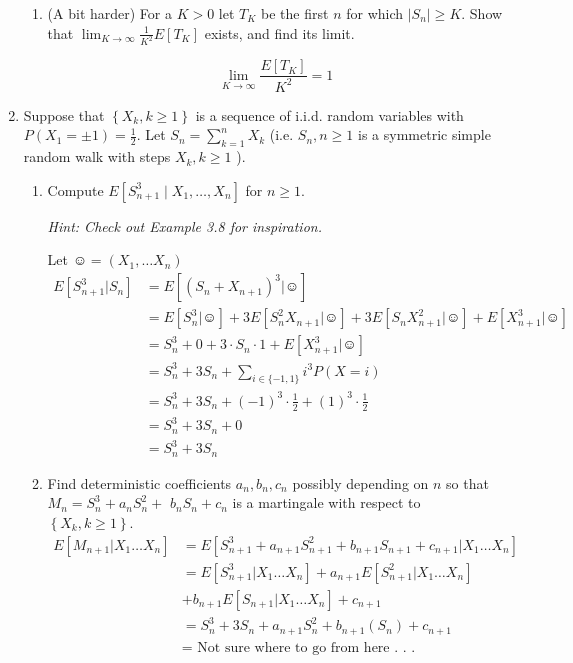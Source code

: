 \documentclass{article} %
\theoremstyle{plain}
\theoremstyle{case}
\begin{document}
\begin{enumerate}[label={\fbox{\textbf{Exercise \#\arabic* :}}}]
\begin{enumerate}
    \item  (A bit harder) For a $K>0$ let $T_K$ be the first $n$ for which $\left|S_n\right| \geq K$. Show that $\lim _{K \rightarrow \infty} \frac{1}{K^2} E\left[T_K\right]$ exists, and find its limit.

    \[ \lim_{K \to \infty} \frac{E[T_K]}{K^2} = 1 \]
  \end{enumerate}

\newpage
  \item Suppose that $\left\{X_k, k \geq 1\right\}$ is a sequence of i.i.d. random variables with $P\left(X_1= \pm 1\right)=\frac{1}{2}$. Let $S_n=\sum_{k=1}^n X_k$ (i.e. $S_n, n \geq 1$ is a symmetric simple random walk with steps $X_k, k \geq 1$ ).

\begin{enumerate}
  \item  Compute $E\left[S_{n+1}^3 \mid X_1, \ldots, X_n\right]$ for $n \geq 1$.

    \emph{Hint: Check out Example 3.8 for inspiration.}

    Let $\smiley{} = (X_1, \dots X_n)$
    \begin{align*}
      E[S_{n+1}^3|S_n] &= E[(S_n + X_{n+1})^3|\smiley{}] \\
                       &= E[S_n^3|\smiley{}] + 3E[S_n^2X_{n+1}|\smiley{}] +
                       3E[S_nX_{n+1}^2|\smiley{}] + E[X_{n+1}^3|\smiley{}] \\
             &= S_n^3 + 0 + 3 \cdot S_n \cdot 1 +
             E[X_{n+1}^3|\smiley{}] \\
             &= S_n^3 + 3 S_n +
                     \sum^{}_{i \in \{-1,1\}} i^3 P(X=i)  \\
             &= S_n^3 + 3 S_n +
                     (-1)^3 \cdot \frac{1}{2} + (1)^3 \cdot \frac{1}{2} \\
             &= S_n^3 + 3 S_n + 0 \\
             &= S_n^3 + 3 S_n 
    \end{align*}
  \item Find deterministic coefficients $a_n, b_n, c_n$ possibly depending on $n$ so that $M_n=S_n^3+a_n S_n^2+$ $b_n S_n+c_n$ is a martingale with respect to $\left\{X_k, k \geq 1\right\}$.
$$
    \begin{align*}
        E[M_{n+1} | X_1 \ldots X_n] 
        & =E[S_{n+1}^3+a_{n+1} S_{n+1}^2+b_{n+1} S_{n+1}+c_{n+1} | X_1 \ldots X_n] \\
        & =E[S_{n+1}^3| X_1 \ldots X_n] +a_{n+1} E[S_{n+1}^2| X_1 \ldots X_n] \\
        &   +b_{n+1} E[S_{n+1}| X_1 \ldots X_n] +c_{n+1} \\
        & =S_n^3+3 S_n+a_{n+1} S_n^2+b_{n+1}(S_n)+c_{n+1} \\
        &= \text{ Not sure where to go from here . . . }
    \end{align*}
$$
\end{enumerate}
\newpage


\end{enumerate}
\end{document}
